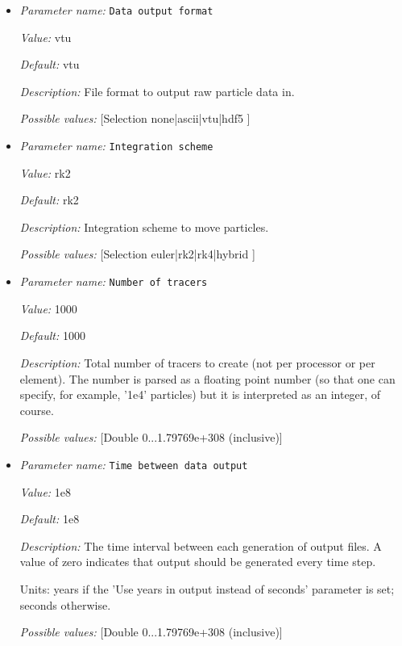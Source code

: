 \begin{itemize}
\item {\it Parameter name:} {\tt Data output format}
\label{parameters:Postprocess/Tracers/Data output format}


{\it Value:} vtu


{\it Default:} vtu


{\it Description:} File format to output raw particle data in.


{\it Possible values:} [Selection none|ascii|vtu|hdf5 ]
\item {\it Parameter name:} {\tt Integration scheme}
\label{parameters:Postprocess/Tracers/Integration scheme}


{\it Value:} rk2


{\it Default:} rk2


{\it Description:} Integration scheme to move particles.


{\it Possible values:} [Selection euler|rk2|rk4|hybrid ]
\item {\it Parameter name:} {\tt Number of tracers}
\label{parameters:Postprocess/Tracers/Number of tracers}


{\it Value:} 1000


{\it Default:} 1000


{\it Description:} Total number of tracers to create (not per processor or per element). The number is parsed as a floating point number (so that one can specify, for example, '1e4' particles) but it is interpreted as an integer, of course.


{\it Possible values:} [Double 0...1.79769e+308 (inclusive)]
\item {\it Parameter name:} {\tt Time between data output}
\label{parameters:Postprocess/Tracers/Time between data output}


{\it Value:} 1e8


{\it Default:} 1e8


{\it Description:} The time interval between each generation of output files. A value of zero indicates that output should be generated every time step.

Units: years if the 'Use years in output instead of seconds' parameter is set; seconds otherwise.


{\it Possible values:} [Double 0...1.79769e+308 (inclusive)]
\end{itemize}

